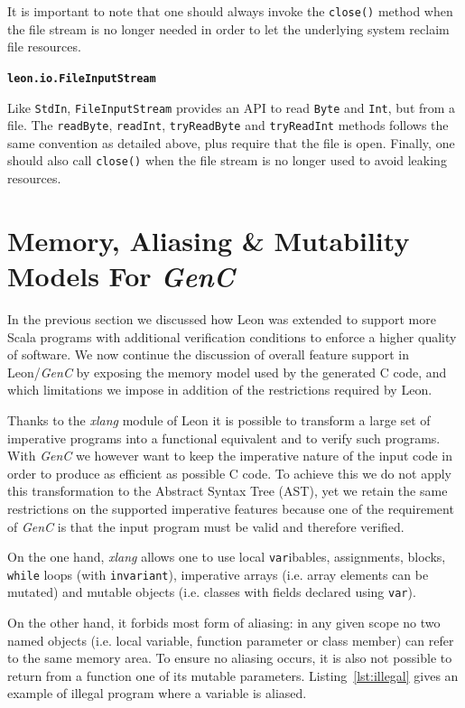 \documentclass[a4paper,twoside]{article}
\newcommand{\Inline}[1]{\lstinline[basicstyle=\ttfamily]|#1|}
\newcommand{\InlineS}[1]{\lstinline[language=Leon]|#1|}
\newcommand*{\lstitem}[1]{
  \setbox0\hbox{\textbf{\Inline{#1}}}
  \item[\usebox0]
}
\let\oldsection\section
\renewcommand\section{\cleardoublepage\oldsection}
\newcommand{\GenC}{\emph{GenC}\xspace}
\newcommand{\RefCode}[1]{Listing~\ref{#1}}
\begin{document}
\begin{description}
It is important to note that one should always invoke the \InlineS{close()}
method when the file stream is no longer needed in order to let the underlying
system reclaim file resources.

\lstitem{leon.io.FileInputStream}

Like \InlineS{StdIn}, \InlineS{FileInputStream} provides an API to read
\InlineS{Byte} and \InlineS{Int}, but from a file. The \InlineS{readByte},
\InlineS{readInt}, \InlineS{tryReadByte} and \InlineS{tryReadInt} methods
follows the same convention as detailed above, plus require that the file is
open. Finally, one should also call \InlineS{close()} when the file stream is no
longer used to avoid leaking resources.

\end{description}

\section{Memory, Aliasing \& Mutability Models For \GenC}
\label{memory_model}
\label{aliasing}
\label{mutability}

In the previous section we discussed how Leon was extended to support more Scala
programs with additional verification conditions to enforce a higher quality of
software. We now continue the discussion of overall feature support in
Leon/\GenC by exposing the memory model used by the generated C code, and which
limitations we impose in addition of the restrictions required by Leon.

Thanks to the \emph{xlang} module of Leon it is possible to transform a large
set of imperative programs into a functional equivalent and to verify such
programs. With \GenC we however want to keep the imperative nature of the input
code in order to produce as efficient as possible C code. To achieve this we do
not apply this transformation to the Abstract Syntax Tree (AST), yet we retain
the same restrictions on the supported imperative features because one of the
requirement of \GenC is that the input program must be valid and therefore
verified.

On the one hand, \emph{xlang} allows one to use local \InlineS{var}ibables,
assignments, blocks, \InlineS{while} loops (with \InlineS{invariant}),
imperative arrays (i.e. array elements can be mutated) and mutable objects (i.e.
classes with fields declared using \InlineS{var}).

On the other hand, it forbids most form of aliasing: in any given scope no two
named objects (i.e. local variable, function parameter or class member) can
refer to the same memory area. To ensure no aliasing occurs, it is also not
possible to return from a function one of its mutable parameters.
\RefCode{lst:illegal} gives an example of illegal program where a variable is
aliased.
\end{document}

